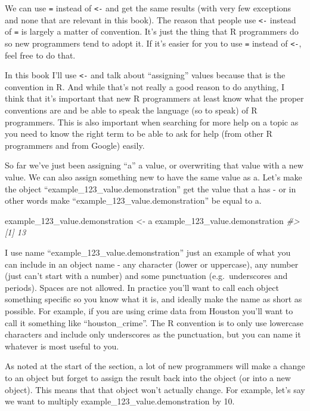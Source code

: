 \documentclass[
]{krantz}
\makeatletter
\newenvironment{Shaded}{\begin{snugshade}}{\end{snugshade}}
\newcommand{\CommentTok}[1]{\textcolor[rgb]{0.37,0.37,0.37}{\textit{#1}}}
\newcommand{\NormalTok}[1]{#1}
\newcommand{\OtherTok}[1]{\textcolor[rgb]{0.37,0.37,0.37}{#1}}
\newenvironment{kframe}{%
\medskip{}
\setlength{\fboxsep}{.8em}
 \def\at@end@of@kframe{}%
 \ifinner\ifhmode%
  \def\at@end@of@kframe{\end{minipage}}%
  \begin{minipage}{\columnwidth}%
 \fi\fi%
 \def\FrameCommand##1{\hskip\@totalleftmargin \hskip-\fboxsep
 \colorbox{shadecolor}{##1}\hskip-\fboxsep
     \hskip-\linewidth \hskip-\@totalleftmargin \hskip\columnwidth}%
 \MakeFramed {\advance\hsize-\width
   \@totalleftmargin\z@ \linewidth\hsize
   \@setminipage}}%
 {\par\unskip\endMakeFramed%
 \at@end@of@kframe}
\renewenvironment{Shaded}{\begin{kframe}}{\end{kframe}}
\makeatother
\begin{document}
We can use \texttt{=} instead of \texttt{\textless{}-} and
get the same results (with very few exceptions and none that
are relevant in this book). The reason that people use
\texttt{\textless{}-} instead of \texttt{=} is largely a
matter of convention. It's just the thing that R programmers
do so new programmers tend to adopt it. If it's easier for
you to use \texttt{=} instead of \texttt{\textless{}-}, feel
free to do that.

In this book I'll use \texttt{\textless{}-} and talk about
``assigning'' values because that is the convention in R.
And while that's not really a good reason to do anything, I
think that it's important that new R programmers at least
know what the proper conventions are and be able to speak
the language (so to speak) of R programmers. This is also
important when searching for more help on a topic as you
need to know the right term to be able to ask for help (from
other R programmers and from Google) easily.

So far we've just been assigning ``a'' a value, or
overwriting that value with a new value. We can also assign
something new to have the same value as a. Let's make the
object ``example\_123\_value.demonstration'' get the value
that a has - or in other words make
``example\_123\_value.demonstration'' be equal to a.

\begin{Shaded}
\begin{Highlighting}[]
\NormalTok{example\_123\_value.demonstration }\OtherTok{\textless{}{-}}\NormalTok{ a}
\NormalTok{example\_123\_value.demonstration}
\CommentTok{\#\textgreater{} [1] 13}
\end{Highlighting}
\end{Shaded}

I use name ``example\_123\_value.demonstration'' just an
example of what you can include in an object name - any
character (lower or uppercase), any number (just can't start
with a number) and some punctuation (e.g.~underscores and
periods). Spaces are not allowed. In practice you'll want to
call each object something specific so you know what it is,
and ideally make the name as short as possible. For example,
if you are using crime data from Houston you'll want to call
it something like ``houston\_crime''. The R convention is to
only use lowercase characters and include only underscores
as the punctuation, but you can name it whatever is most
useful to you.

As noted at the start of the section, a lot of new
programmers will make a change to an object but forget to
assign the result back into the object (or into a new
object). This means that that object won't actually change.
For example, let's say we want to multiply
example\_123\_value.demonstration by 10.
\end{document}
